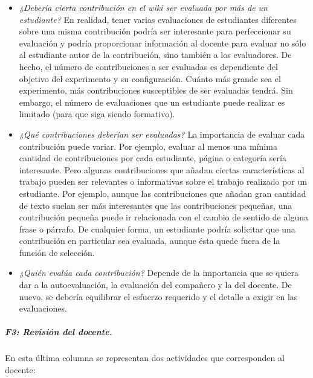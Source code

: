 			\begin{itemize}
				\item \emph{¿Debería cierta contribución en el wiki ser evaluada por más de un estudiante?} En realidad, tener varias evaluaciones de estudiantes diferentes sobre una misma contribución podría ser interesante para perfeccionar su evaluación y podría proporcionar información al docente para evaluar no sólo al estudiante autor de la contribución, sino también a los evaluadores. De hecho, el número de contribuciones a ser evaluadas es dependiente del objetivo del experimento y su configuración. Cuánto más grande sea el experimento, más contribuciones susceptibles de ser evaluadas tendrá. Sin embargo, el número de evaluaciones que un estudiante puede realizar es limitado (para que siga siendo formativo).
				\item \emph{¿Qué contribuciones deberían ser evaluadas?} La importancia de evaluar cada contribución puede variar. Por ejemplo, evaluar al menos una mínima cantidad de contribuciones por cada estudiante, página o categoría sería interesante. Pero algunas contribuciones que añadan ciertas características al trabajo pueden ser relevantes o informativas sobre el trabajo realizado por un estudiante. Por ejemplo, aunque las contribuciones que añadan gran cantidad de texto suelan ser más interesantes que las contribuciones pequeñas, una contribución pequeña puede ir relacionada con el cambio de sentido de alguna frase o párrafo. De cualquier forma, un estudiante podría solicitar que una contribución en particular sea evaluada, aunque ésta quede fuera de la función de selección.
				\item \emph{¿Quién evalúa cada contribución?} Depende de la importancia que se quiera dar a la autoevaluación, la evaluación del compañero y la del docente. De nuevo, se debería equilibrar el esfuerzo requerido y el detalle a exigir en las evaluaciones.
			\end{itemize}


			\subparagraph*{F3: Revisión del docente.}

			En esta última columna se representan dos actividades que corresponden al docente:

